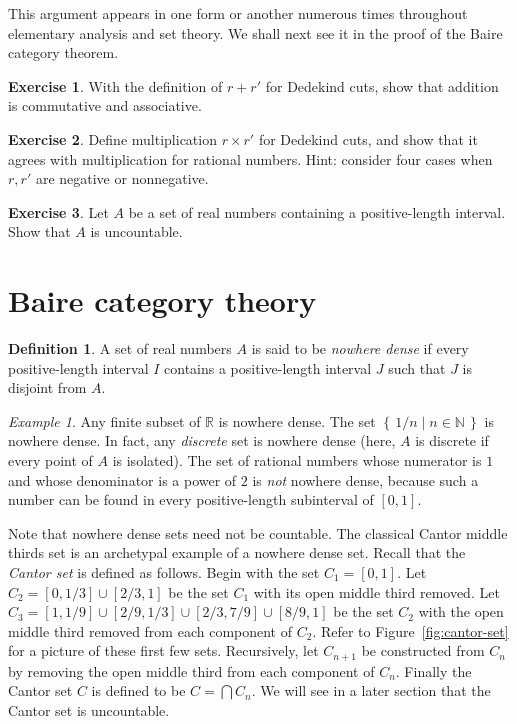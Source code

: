 \documentclass[11pt,oneside]{amsart}
\newcommand{\set}[1]{\left\{\,#1\,\right\}}
\newcommand{\NN}{\mathbb N}
\newcommand{\RR}{\mathbb R}
\theoremstyle{definition}
\newtheorem{exerc}{Exercise}[section]
\theoremstyle{definition}
\newtheorem{defn}[thm]{Definition}
\theoremstyle{remark}
\newtheorem{example}[thm]{Example}
\begin{document}
This argument appears in one form or another numerous times throughout elementary analysis and set theory. We shall next see it in the proof of the Baire category theorem.

\begin{exerc}
  With the definition of $r+r'$ for Dedekind cuts, show that addition is commutative and associative.
\end{exerc}

\begin{exerc}
  Define multiplication $r\times r'$ for Dedekind cuts, and show that it agrees with multiplication for rational numbers. Hint: consider four cases when $r,r'$ are negative or nonnegative.
\end{exerc}

\begin{exerc}
  Let $A$ be a set of real numbers containing a positive-length interval. Show that $A$ is uncountable.
\end{exerc}


\section{Baire category theory}

\begin{defn}
  A set of real numbers $A$ is said to be \emph{nowhere dense} if every positive-length interval $I$ contains a positive-length interval $J$ such that $J$ is disjoint from $A$.
\end{defn}

\begin{example}
  Any finite subset of $\RR$ is nowhere dense. The set $\set{1/n\mid n\in\NN}$ is nowhere dense. In fact, any \emph{discrete} set is nowhere dense (here, $A$ is discrete if every point of $A$ is isolated). The set of rational numbers whose numerator is $1$ and whose denominator is a power of $2$ is \emph{not} nowhere dense, because such a number can be found in every positive-length subinterval of $[0,1]$.
\end{example}

Note that nowhere dense sets need not be countable. The classical Cantor middle thirds set is an archetypal example of a nowhere dense set. Recall that the \emph{Cantor set} is defined as follows. Begin with the set $C_1=[0,1]$. Let $C_2=[0,1/3]\cup[2/3,1]$ be the set $C_1$ with its open middle third removed. Let $C_3=[1,1/9]\cup[2/9,1/3]\cup[2/3,7/9]\cup[8/9,1]$ be the set $C_2$ with the open middle third removed from each component of $C_2$. Refer to Figure~\ref{fig:cantor-set} for a picture of these first few sets. Recursively, let $C_{n+1}$ be constructed from $C_n$ by removing the open middle third from each component of $C_n$. Finally the Cantor set $C$ is defined to be $C=\bigcap C_n$. We will see in a later section that the Cantor set is uncountable. %
\end{document}
